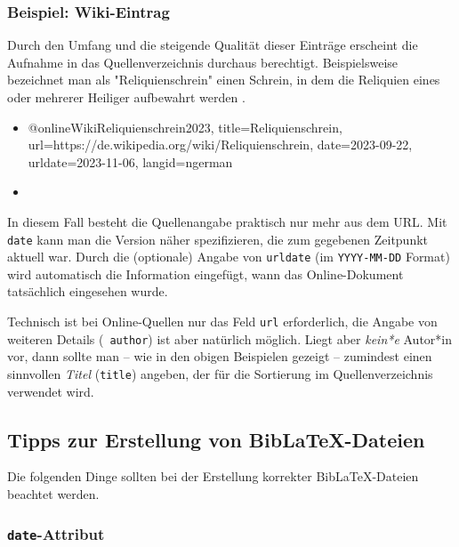 \subsubsection{Beispiel: Wiki-Eintrag}
\label{sec:@online-www}

Durch den Umfang und die steigende Qualität dieser Einträge erscheint die
Aufnahme in das Quellenverzeichnis durchaus berechtigt. Beispielsweise
bezeichnet man als "Reliquienschrein" einen Schrein, in dem die Reliquien
eines oder mehrerer Heiliger aufbewahrt werden \cite{WikiReliquienschrein2023}.
%
\begin{itemize}
\item[]
\begin{GenericCode}[numbers=none]
@online{WikiReliquienschrein2023,
  title={Reliquienschrein},
  url={https://de.wikipedia.org/wiki/Reliquienschrein},
  date={2023-09-22},
  urldate={2023-11-06},
  langid={ngerman}
}
\end{GenericCode}
\item[\cite{WikiReliquienschrein2023}] 
\end{itemize}
%
In diesem Fall besteht die Quellenangabe praktisch nur mehr aus dem URL. Mit
\texttt{date} kann man die Version näher spezifizieren, die zum gegebenen
Zeitpunkt aktuell war. Durch die (optionale) Angabe von \texttt{urldate} (im
\texttt{YYYY-MM-DD} Format) wird automatisch die Information eingefügt, wann
das Online-Dokument tatsächlich eingesehen wurde.

Technisch ist bei Online-Quellen nur das Feld \texttt{url}
erforderlich, die Angabe von weiteren Details (\zB\ \texttt{author}) ist aber
natürlich möglich. Liegt aber \emph{kein*e} Autor*in vor, dann sollte man --
wie in den obigen Beispielen gezeigt -- zumindest einen sinnvollen
\emph{Titel} (\texttt{title}) angeben, der für die Sortierung im
Quellenverzeichnis verwendet wird.


\subsection{Tipps zur Erstellung von BibLaTeX-Dateien}
\label{sec:TippsZuBiblatex}

Die folgenden Dinge sollten bei der Erstellung korrekter BibLaTeX-Dateien
beachtet werden.

\subsubsection{\texttt{date}-Attribut}

